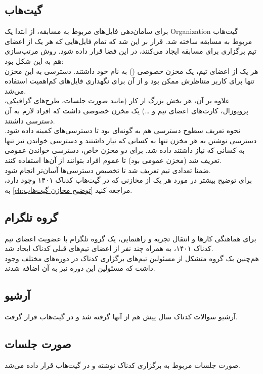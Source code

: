 \documentclass{report}
\begin{document}
\subsection{گیت‌هاب}
برای سامان‌دهی فایل‌های مربوط به مسابقه، از ابتدا یک Organization گیت‌هاب مربوط به مسابقه ساخته شد. قرار بر این شد که تمام فایل‌هایی که هر یک از اعضای تیم برگزاری برای مسابقه ایجاد می‌کنند، در این فضا قرار داده شود. روش مرتب‌سازی هم به این شکل بود: \\
هر یک از اعضای تیم، یک مخزن خصوصی
()
به نام خود داشتند. دسترسی به این مخزن تنها برای کاربر متناظرش ممکن بود و از آن برای نگهداری فایل‌های کم‌اهمیت استفاده می‌شد. \\
علاوه بر آن، هر بخش بزرگ از کار (مانند صورت جلسات، طرح‌های گرافیکی، پروپوزال، کارت‌های اعضای تیم و \dots) یک مخزن خصوصی داشت که افراد لازم به آن دسترسی داشتند. \\
نحوه تعریف سطوح دسترسی هم به گونه‌ای بود تا دسترسی‌های کمینه داده شود. دسترسی نوشتن به هر مخزن تنها به کسانی که نیاز داشتند و دسترسی خواندن نیز تنها به کسانی که نیاز داشتند داده شد. برای دو مخزن خاص، دسترسی خواندن عمومی تعریف شد (مخزن عمومی بود) تا عموم افراد بتوانند از آن‌ها استفاده کنند. \\
ضمنا تعدادی تیم تعریف شد تا تخصیص دسترسی‌ها آسان‌تر انجام شود. \\
برای توضیح بیشتر در مورد هر یک از مخازنی که در گیت‌هاب کدناک ۱۴۰۱ وجود دارد، به \autoref{ch:توضیح مخازن گیت‌هاب} مراجعه کنید.

\subsection{گروه تلگرام}
برای هماهنگی کارها و انتقال تجربه و راهنمایی، یک گروه تلگرام با عضویت اعضای تیم کدناک ۱۴۰۱، به همراه چند نفر از اعضای تیم‌های قبلی کدناک ایجاد شد. \\
هم‌چنین یک گروه متشکل از مسئولین تیم‌های برگزاری کدناک در دوره‌های مختلف وجود داشت که مسئولین این دوره نیز به آن اضافه شدند.

\subsection{آرشیو}
آرشیو سوالات کدناک سال پیش هم از آنها گرفته شد و در گیت‌هاب قرار گرفت. 

\subsection{صورت جلسات}
صورت جلسات مربوط به برگزاری کدناک نوشته و در گیت‌هاب قرار داده می‌شد.
\end{document}
